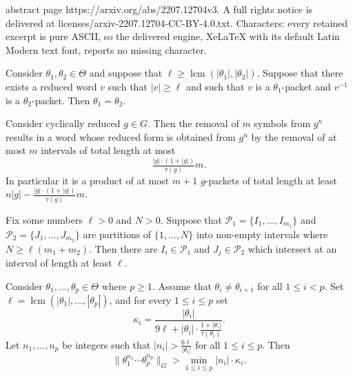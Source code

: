 \documentclass[10pt,a4paper]{amsart}
\newcommand{\C}[1]{\mathcal{#1}}
\newcommand{\OP}[1]{\operatorname{#1}}
\begin{document}
abstract page https://arxiv.org/abs/2207.12704v3. A full rights notice is delivered at licenses/arxiv-2207.12704-CC-BY-4.0.txt. Characters: every retained excerpt is pure ASCII, so the delivered engine, XeLaTeX with its default Latin Modern text font, reports no missing character.
\begin{lemma}\label{L:equal packets equal words}
Consider $\theta_1, \theta_2 \in \Theta$ and suppose that $\ell \geq \OP{lcm}(|\theta_1|,|\theta_2|)$.
Suppose that there exists a reduced word $v$ such that $|v| \geq \ell$ and such that $v$ is a $\theta_1$-packet and $v^{-1}$ is a $\theta_2$-packet.
Then $\theta_1=\theta_2$.
\end{lemma}

\begin{lemma}\label{L:small intervals reduction}
Consider cyclically reduced $g \in G$.
Then the removal of $m$ symbols from $g^n$ results in a  word whose reduced form is obtained from $g^n$ by the removal of at most $m$ intervals of total length at most
\[
\tfrac{|g| \cdot (1+|g|)}{\tau(g)} m.
\]
In particular it is a product of at most $m+1$ $g$-packets of total length at least $n|g|-\tfrac{|g|\cdot(1+|g|)}{\tau(g)} m$.
\end{lemma}

\begin{lemma}\label{L:collision of partitions}
Fix some numbers $\ell >0$ and $N>0$.
Suppose that $\C P_1=\{I_1,\dots,I_{m_1}\}$ and $\C P_2=\{J_1,\dots,J_{m_2}\}$ are partitions of $\{1,\dots,N\}$ into non-empty intervals where $N \geq \ell(m_1+m_2)$.
Then there are $I_i \in \C P_1$ and $J_j \in \C P_2$ which intersect at an interval of length at least $\ell$.
\end{lemma}

\begin{lemma}\label{L:non triviality product Theta}
Consider $\theta_1,\dots,\theta_p \in \Theta$  where $p \geq 1$.
Assume that $\theta_i \neq \theta_{i+1}$ for all $1 \leq i <p$.
Set $\ell=\OP{lcm}(|\theta_1|,\dots,|\theta_p|)$, and for every $1 \leq i \leq p$ set
\[
\kappa_i = \frac{|\theta_i|}{9\ell+|\theta_i| \cdot \tfrac{1+|\theta_i|}{\tau(\theta_i)}}.
\]
Let $n_1,\dots,n_p$ be integers such that $|n_i| >\tfrac{6 \ell}{|\theta_i|}$ for all $1 \leq i \leq p$.
Then
\[
\| \theta_1^{n_1} \cdots \theta_p^{n_p} \|_G >\min_{1 \leq i \leq p} |n_i| \cdot \kappa_i.
\]
\end{lemma}
\end{document}
